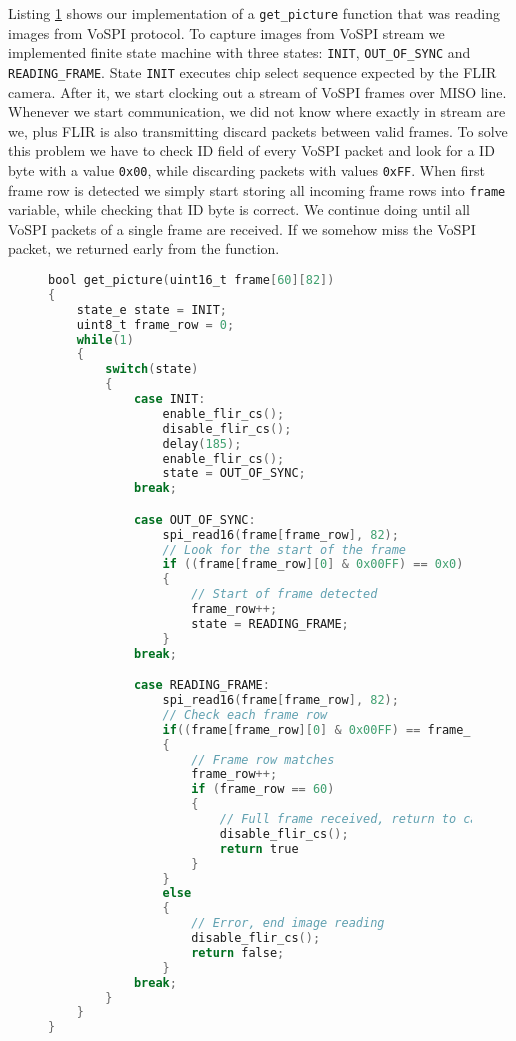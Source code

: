 Listing \ref{vospi_code} shows our implementation of a \verb|get_picture| function that was reading images from VoSPI protocol.
To capture images from VoSPI stream we implemented finite state machine with three states: \verb|INIT|, \verb|OUT_OF_SYNC| and \verb|READING_FRAME|.
State \verb|INIT| executes chip select sequence expected by the FLIR camera.
After it, we start clocking out a stream of VoSPI frames over MISO line.
Whenever we start communication, we did not know where exactly in stream are we, plus FLIR is also transmitting discard packets between valid frames.
To solve this problem we have to check ID field of every VoSPI packet and look for a ID byte with a value \verb|0x00|, while discarding packets with values \verb|0xFF|.
When first frame row is detected we simply start storing all incoming frame rows into \verb|frame| variable, while checking that ID byte is correct.
We continue doing until all VoSPI packets of a single frame are received.
If we somehow miss the VoSPI packet, we returned early from the function.
\lstset{style=mystyle}
\begin{figure}[ht]
\begin{lstlisting}[language=C]
bool get_picture(uint16_t frame[60][82])
{
    state_e state = INIT;
    uint8_t frame_row = 0;
    while(1) 
    {
        switch(state) 
        {
            case INIT:
                enable_flir_cs();
                disable_flir_cs();
                delay(185);
                enable_flir_cs();
                state = OUT_OF_SYNC;
            break;

            case OUT_OF_SYNC:
                spi_read16(frame[frame_row], 82);
                // Look for the start of the frame
                if ((frame[frame_row][0] & 0x00FF) == 0x0) 
                {
                    // Start of frame detected
                    frame_row++;
                    state = READING_FRAME;
                }
            break;

            case READING_FRAME:
                spi_read16(frame[frame_row], 82);
                // Check each frame row
                if((frame[frame_row][0] & 0x00FF) == frame_row) 
                {
                    // Frame row matches
                    frame_row++;
                    if (frame_row == 60) 
                    {
                        // Full frame received, return to caller
                        disable_flir_cs();
                        return true
                    }
                }
                else 
                {
                    // Error, end image reading
                    disable_flir_cs();
                    return false;
                }
            break;
        }
    }
}
\end{lstlisting}
\label{vospi_code}
\end{figure}

